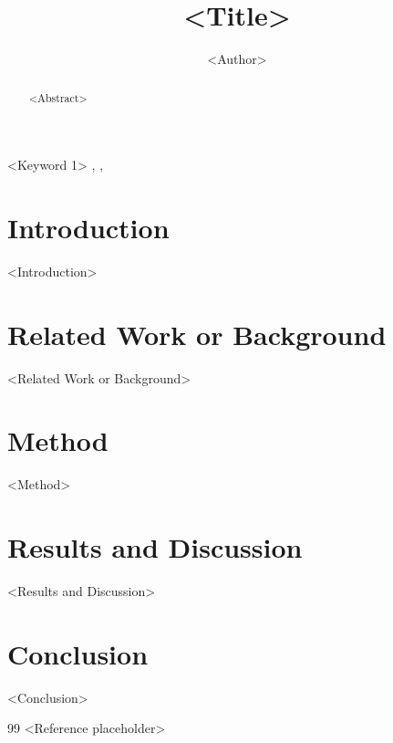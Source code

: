 \documentclass[preprint,12pt]{elsarticle}
\begin{document}
\begin{frontmatter}

\title{<Title>}
\author{<Author>}
\address{<Affiliation>}
\begin{abstract}
<Abstract>
\end{abstract}

\begin{keyword}
<Keyword 1> \sep <Keyword 2> \sep <Keyword 3>
\end{keyword}

\end{frontmatter}

\section{Introduction}
<Introduction>

\section{Related Work or Background}
<Related Work or Background>

\section{Method}
<Method>

\section{Results and Discussion}
<Results and Discussion>

\section{Conclusion}
<Conclusion>

\begin{thebibliography}{99}
 <Reference placeholder>
\end{thebibliography}
\end{document}
